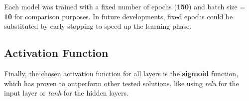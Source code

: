Each model was trained with a fixed number of epochs (\textbf{150}) and batch size = \textbf{10} for comparison purposes. In future developments, fixed epochs could be substituted by early stopping to speed up the learning phase.

\subsection{Activation Function}

Finally, the chosen activation function for all layers is the \textbf{sigmoid} function, which has proven to outperform other tested solutions, like using \textit{relu} for the input layer or \textit{tanh} for the hidden layers. 



